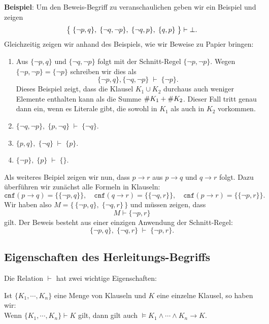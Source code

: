 \noindent
\textbf{Beispiel}:  Um den Beweis-Begriff zu veranschaulichen geben wir ein Beispiel und
zeigen 
\[ \bigl\{\; \{\neg p, q\},\; \{ \neg q, \neg p \},\; \{ \neg q, p \},\; \{ q, p \}\; \bigr\} \vdash \bot.
\]
Gleichzeitig zeigen wir anhand des Beispiels, wie wir Beweise zu Papier bringen:
\begin{enumerate}
\item Aus $\{\neg p, q \}$ und $\{ \neg q, \neg p \}$ folgt mit der Schnitt-Regel   
      $\{ \neg p, \neg p \}$.   Wegen $\{ \neg p, \neg p \} = \{ \neg p \}$
      schreiben wir dies als 
      \[ \{\neg p, q \}, \{ \neg q, \neg p \} \;\vdash\; \{ \neg p \}. \]
      Dieses Beispiel zeigt, dass die Klausel $K_1 \cup K_2$ durchaus auch weniger
      Elemente enthalten kann als die Summe $\symbol{35}K_1 + \symbol{35}K_2$.  Dieser
      Fall tritt genau dann ein, wenn es Literale gibt, die sowohl in $K_1$ als auch in
      $K_2$ vorkommen.
\item $\{\neg q, \neg p \},\; \{ p, \neg q \} \;\vdash\; \{ \neg q \}$. 
\item $\{ p, q \},\; \{ \neg q \} \;\vdash\; \{ p \}$. 
\item $\{ \neg p \},\; \{ p \} \;\vdash\; \{\}$. 
\end{enumerate}
Als weiteres Beipiel zeigen wir nun, dass $p \rightarrow r$ aus $p \rightarrow q$ und $q \rightarrow r$ 
folgt.  Dazu überführen wir zunächst alle Formeln in Klauseln: 
\[ \texttt{cnf}(p \rightarrow q) = \bigl\{ \{ \neg p, q \} \bigr\}, \quad
   \texttt{cnf}(q \rightarrow r) = \bigl\{ \{ \neg q, r \} \bigr\}, \quad 
   \texttt{cnf}(p \rightarrow r) = \bigl\{ \{ \neg p, r \} \bigr\}.
\]
Wir haben also $M = \bigl\{\, \{ \neg p, q \},\; \{ \neg q, r \}\,\bigr\}$ und müssen zeigen, dass
\[ M \vdash  \{ \neg p, r \} \]
gilt.  Der Beweis besteht aus einer einzigen Anwendung der Schnitt-Regel: 
\[ \{ \neg p, q \},\; \{ \neg q, r \} \;\vdash\; \{ \neg p, r \}. \]

\subsection{Eigenschaften des Herleitungs-Begriffs}
Die Relation $\vdash$ hat zwei wichtige Eigenschaften:

\begin{Satz}
  Ist $\{K_1, \cdots, K_n \}$ eine Menge von Klauseln und $K$ eine einzelne Klausel,
  so haben wir: \\[0.2cm]
  \hspace*{3.3cm} Wenn $\{K_1, \cdots, K_n \} \vdash K$ gilt, dann gilt auch $\models K_1 \wedge \cdots \wedge K_n \rightarrow K$.  
\end{Satz}

